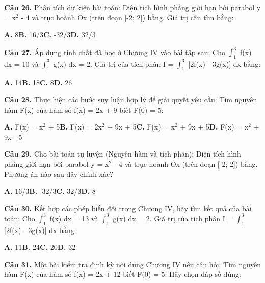 \documentclass[11pt,a4paper]{article}
\begin{document}
\textbf{\color{primary} Câu 26.} Phân tích dữ kiện bài toán: Diện tích hình phẳng giới hạn bởi parabol y = x$^2$ - 4 và trục hoành Ox (trên đoạn [-2; 2]) bằng. Giá trị cần tìm bằng:\par
\hspace*{1.5em}\textbf{A.} 8\quad\quad \textbf{B.} 16/3\quad\quad \textbf{C.} -32/3\quad\quad \textbf{D.} 32/3\par\vspace{2pt}
\textbf{\color{primary} Câu 27.} Áp dụng tính chất đã học ở Chương IV vào bài tập sau: Cho $\int_{1}^{3}$ f(x) dx = 10 và $\int_{1}^{3}$ g(x) dx = 2. Giá trị của tích phân I = $\int_{1}^{3}$ [2f(x) - 3g(x)] dx bằng:\par
\hspace*{1.5em}\textbf{A.} 14\quad\quad \textbf{B.} 18\quad\quad \textbf{C.} 8\quad\quad \textbf{D.} 26\par\vspace{2pt}
\textbf{\color{primary} Câu 28.} Thực hiện các bước suy luận hợp lý để giải quyết yêu cầu: Tìm nguyên hàm F(x) của hàm số f(x) = 2x + 9 biết F(0) = 5:\par
\hspace*{1.5em}\textbf{A.} F(x) = x$^2$ + 5\quad\quad \textbf{B.} F(x) = 2x$^2$ + 9x + 5\quad\quad \textbf{C.} F(x) = x$^2$ + 9x + 5\quad\quad \textbf{D.} F(x) = x$^2$ + 9x - 5\par\vspace{2pt}
\textbf{\color{primary} Câu 29.} Cho bài toán tự luyện (Nguyên hàm và tích phân): Diện tích hình phẳng giới hạn bởi parabol y = x$^2$ - 4 và trục hoành Ox (trên đoạn [-2; 2]) bằng. Phương án nào sau đây chính xác?\par
\hspace*{1.5em}\textbf{A.} 16/3\quad\quad \textbf{B.} -32/3\quad\quad \textbf{C.} 32/3\quad\quad \textbf{D.} 8\par\vspace{2pt}
\textbf{\color{primary} Câu 30.} Kết hợp các phép biến đổi trong Chương IV, hãy tìm kết quả của bài toán: Cho $\int_{1}^{3}$ f(x) dx = 13 và $\int_{1}^{3}$ g(x) dx = 2. Giá trị của tích phân I = $\int_{1}^{3}$ [2f(x) - 3g(x)] dx bằng:\par
\hspace*{1.5em}\textbf{A.} 11\quad\quad \textbf{B.} 24\quad\quad \textbf{C.} 20\quad\quad \textbf{D.} 32\par\vspace{2pt}
\textbf{\color{primary} Câu 31.} Một bài kiểm tra định kỳ nội dung Chương IV nêu câu hỏi: Tìm nguyên hàm F(x) của hàm số f(x) = 2x + 12 biết F(0) = 5. Hãy chọn đáp số đúng:\par
\end{document}
